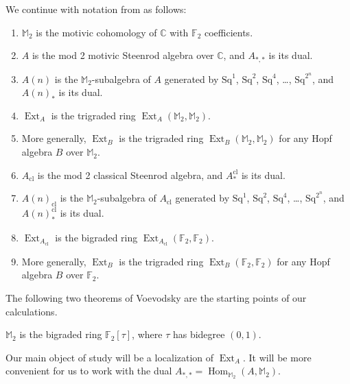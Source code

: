 \documentclass[10pt]{amsart}
\begin{document}
We continue with notation from \cite{Istems} as follows:
\begin{enumerate}
\item
${\ensuremath{\mathbb{M}}}_2$ is the motivic cohomology of ${\ensuremath{\mathbb{C}}}$ with ${\ensuremath{\mathbb{F}}}_2$ coefficients.
\item
$A$ is the mod 2 motivic Steenrod algebra over ${\ensuremath{\mathbb{C}}}$,
and $A_{*,*}$ is its dual.
\item
$A(n)$ is the ${\ensuremath{\mathbb{M}}}_2$-subalgebra of $A$ generated by
${\ensuremath{\mathrm{Sq}}}^1$, ${\ensuremath{\mathrm{Sq}}}^2$, ${\ensuremath{\mathrm{Sq}}}^4$, \ldots, ${\ensuremath{\mathrm{Sq}}}^{2^n}$,
and $A(n)_*$ is its dual.
\item
$\operatorname{Ext}_A$ is the trigraded ring $\operatorname{Ext}_A({\ensuremath{\mathbb{M}}}_2,{\ensuremath{\mathbb{M}}}_2)$.
\item
More generally, $\operatorname{Ext}_B$ is the trigraded ring $\operatorname{Ext}_B({\ensuremath{\mathbb{M}}}_2, {\ensuremath{\mathbb{M}}}_2)$
for any Hopf algebra $B$ over ${\ensuremath{\mathbb{M}}}_2$.
\item
$A_{\mathrm{cl}}$ is the mod 2 classical Steenrod algebra,
and $A^{\mathrm{cl}}_*$ is its dual.
\item
$A(n)_{\mathrm{cl}}$ is the ${\ensuremath{\mathbb{M}}}_2$-subalgebra of $A_{\mathrm{cl}}$ generated by
${\ensuremath{\mathrm{Sq}}}^1$, ${\ensuremath{\mathrm{Sq}}}^2$, ${\ensuremath{\mathrm{Sq}}}^4$, \ldots, ${\ensuremath{\mathrm{Sq}}}^{2^n}$,
and $A(n)^{\mathrm{cl}}_*$ is its dual.
\item
$\operatorname{Ext}_{A_{\mathrm{cl}}}$ is the bigraded ring $\operatorname{Ext}_{A_{\mathrm{cl}}}({\ensuremath{\mathbb{F}}}_2,{\ensuremath{\mathbb{F}}}_2)$.
\item
More generally, $\operatorname{Ext}_B$ is the trigraded ring $\operatorname{Ext}_B({\ensuremath{\mathbb{F}}}_2, {\ensuremath{\mathbb{F}}}_2)$
for any Hopf algebra $B$ over ${\ensuremath{\mathbb{F}}}_2$.
\end{enumerate}

The following two  theorems of Voevodsky are the starting points
of our calculations.

\begin{thm}[\cite{V1}]
${\ensuremath{\mathbb{M}}}_2$ is the bigraded ring ${\ensuremath{\mathbb{F}}}_2[\tau]$, where
$\tau$ has bidegree $(0,1)$.
\end{thm}

Our main object of study will be a localization of $\operatorname{Ext}_A$.
It will be more convenient for us to work with the dual $A_{*,*} = \operatorname{Hom}_{{\ensuremath{\mathbb{M}}}_2}(A,{\ensuremath{\mathbb{M}}}_2)$.
\end{document}
